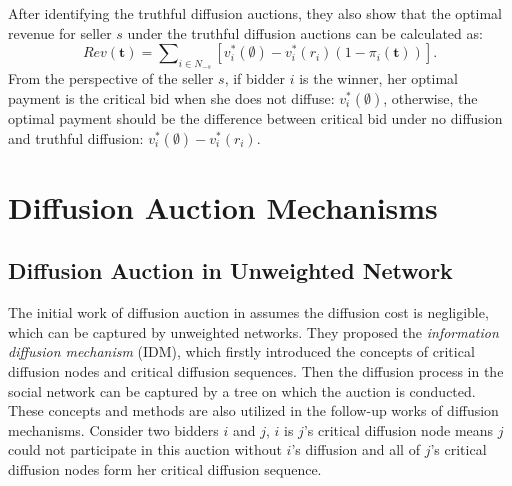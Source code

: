 \documentclass{article}
\begin{document}
After identifying the truthful diffusion auctions, they also show that the optimal revenue for seller $s$ under the truthful diffusion auctions can be calculated as:
\[
    Rev(\mathbf{t})=\sum \nolimits_{i\in N_{-s}} \left[  v^\ast_{i}(\emptyset)-v^\ast_i(r_i)(1-\pi_i(\mathbf{t}))\right].
\]
From the perspective of the seller $s$, if bidder $i$ is the winner, her optimal payment is the critical bid when she does not diffuse: $v^\ast_i(\emptyset)$, otherwise, the optimal payment should be the difference between critical bid under no diffusion and truthful diffusion: $v^\ast_i(\emptyset)-v^\ast_i(r_i)$.


\section{Diffusion Auction Mechanisms}
\subsection{Diffusion Auction in Unweighted Network}
The initial work of diffusion auction in \cite{li2017mechanism} 
assumes the diffusion cost is negligible, which can be captured by unweighted networks. They proposed the \emph{information diffusion mechanism} (IDM), which firstly introduced the concepts of critical diffusion nodes and critical diffusion sequences. Then the diffusion process in the social network can be captured by a tree on which the auction is conducted. These concepts and methods are also utilized in the follow-up works of diffusion mechanisms. Consider two bidders $i$ and $j$, $i$ is $j$'s critical diffusion node means $j$ could not participate in this auction without $i$'s diffusion and all of $j$'s critical diffusion nodes form her critical diffusion sequence.
\end{document}
